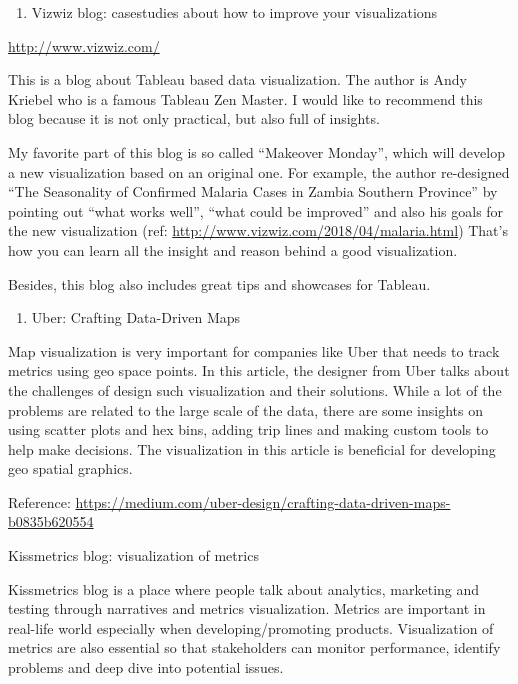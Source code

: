 \documentclass[]{book}
\providecommand{\tightlist}{%
  \setlength{\itemsep}{0pt}\setlength{\parskip}{0pt}}
\theoremstyle{definition}
\theoremstyle{definition}
\theoremstyle{definition}
\theoremstyle{remark}
\begin{document}
\begin{enumerate}
\def\labelenumi{\arabic{enumi}.}
\setcounter{enumi}{7}
\tightlist
\item
  Vizwiz blog: casestudies about how to improve your visualizations
\end{enumerate}

\url{http://www.vizwiz.com/}

This is a blog about Tableau based data visualization. The author is
Andy Kriebel who is a famous Tableau Zen Master. I would like to
recommend this blog because it is not only practical, but also full of
insights.

My favorite part of this blog is so called ``Makeover Monday'', which
will develop a new visualization based on an original one. For example,
the author re-designed ``The Seasonality of Confirmed Malaria Cases in
Zambia Southern Province'' by pointing out ``what works well'', ``what
could be improved'' and also his goals for the new visualization (ref:
\url{http://www.vizwiz.com/2018/04/malaria.html}) That's how you can
learn all the insight and reason behind a good visualization.

Besides, this blog also includes great tips and showcases for Tableau.

\begin{enumerate}
\def\labelenumi{\arabic{enumi}.}
\setcounter{enumi}{6}
\tightlist
\item
  Uber: Crafting Data-Driven Maps
\end{enumerate}

Map visualization is very important for companies like Uber that needs
to track metrics using geo space points. In this article, the designer
from Uber talks about the challenges of design such visualization and
their solutions. While a lot of the problems are related to the large
scale of the data, there are some insights on using scatter plots and
hex bins, adding trip lines and making custom tools to help make
decisions. The visualization in this article is beneficial for
developing geo spatial graphics.

Reference:
\url{https://medium.com/uber-design/crafting-data-driven-maps-b0835b620554}

Kissmetrics blog: visualization of metrics

Kissmetrics blog is a place where people talk about analytics, marketing
and testing through narratives and metrics visualization. Metrics are
important in real-life world especially when developing/promoting
products. Visualization of metrics are also essential so that
stakeholders can monitor performance, identify problems and deep dive
into potential issues.
\end{document}
